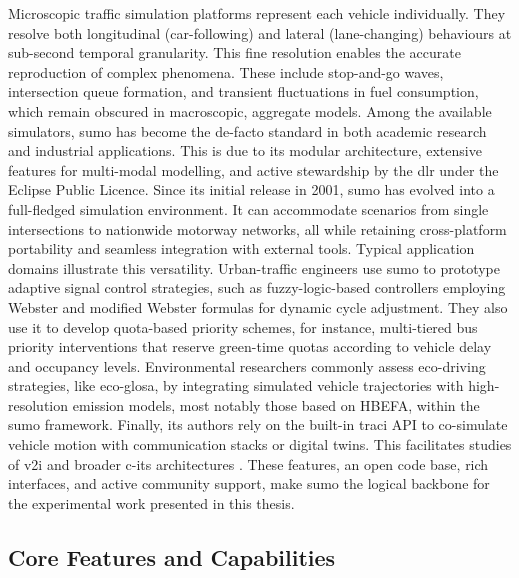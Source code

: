 Microscopic traffic simulation platforms represent each vehicle individually. They resolve both longitudinal (car-following) and lateral (lane-changing) behaviours at sub-second temporal granularity. This fine resolution enables the accurate reproduction of complex phenomena. These include stop-and-go waves, intersection queue formation, and transient fluctuations in fuel consumption, which remain obscured in macroscopic, aggregate models. \cite{Koutsopoulos2005Microsim} Among the available simulators, \ac{sumo} has become the de-facto standard in both academic research and industrial applications. This is due to its modular architecture, extensive features for multi-modal modelling, and active stewardship by the \ac{dlr} under the Eclipse Public Licence. Since its initial release in 2001, \ac{sumo} has evolved into a full-fledged simulation environment. It can accommodate scenarios from single intersections to nationwide motorway networks, all while retaining cross-platform portability and seamless integration with external tools.
\mynewline
Typical application domains illustrate this versatility. Urban-traffic engineers use \ac{sumo} to prototype adaptive signal control strategies, such as fuzzy-logic-based controllers employing Webster and modified Webster formulas for dynamic cycle adjustment. \cite{Ali2021AdaptiveFuzzyWebster} They also use it to develop quota-based priority schemes, for instance, multi-tiered bus priority interventions that reserve green-time quotas according to vehicle delay and occupancy levels. \cite{Schmidt2024BusPriority} Environmental researchers commonly assess eco-driving strategies, like \ac{eco-glosa}, by integrating simulated vehicle trajectories with high-resolution emission models, most notably those based on HBEFA, within the \ac{sumo} framework. \cite{jayawardana2022learning, varga2024systematic} Finally, \ac{its} authors rely on the built-in \ac{traci} API to co-simulate vehicle motion with communication stacks or digital twins. This facilitates studies of \ac{v2i} and broader \ac{c-its} architectures \cite{Sommer2008TraCI}. These features, an open code base, rich interfaces, and active community support, make \ac{sumo} the logical backbone for the experimental work presented in this thesis.


\subsection{Core Features and Capabilities}
\label{subsec:sumo_core_features}

